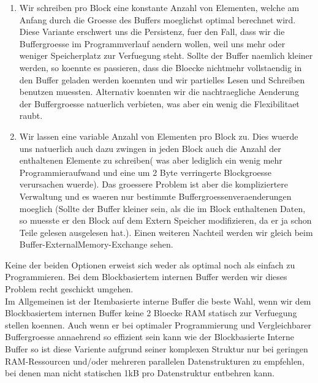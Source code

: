 \documentclass[10pt,a4paper]{article}
\begin{document}
\begin{enumerate}
\item Wir schreiben pro Block eine konstante Anzahl von Elementen, welche am Anfang durch die Groesse des Buffers moeglichst optimal berechnet wird. Diese Variante erschwert uns die Persistenz, fuer den Fall, dass wir die Buffergroesse im Programmverlauf aendern wollen, weil uns mehr oder weniger Speicherplatz zur Verfuegung steht. Sollte der Buffer naemlich kleiner  werden, so koennte es passieren, dass die Bloecke nichtmehr vollstaendig in den Buffer geladen werden koennten und wir partielles Lesen und Schreiben benutzen muessten. Alternativ koennten wir die nachtraegliche Aenderung der Buffergroesse natuerlich verbieten, was aber ein wenig die Flexibilitaet raubt.
\item Wir lassen eine variable Anzahl von Elementen pro Block zu. Dies wuerde uns natuerlich auch dazu zwingen in jeden Block auch die Anzahl der enthaltenen Elemente zu schreiben( was aber lediglich ein wenig mehr Programmieraufwand und eine um 2 Byte verringerte Blockgroesse verursachen wuerde). Das groessere Problem ist aber die kompliziertere Verwaltung und es waeren nur bestimmte Buffergroessenveraenderungen moeglich (Sollte der Buffer kleiner sein, als die im Block enthaltenen Daten, so muesste er den Block auf dem Extern Speicher modifizieren, da er ja schon Teile gelesen ausgelesen hat.). Einen weiteren Nachteil werden wir gleich beim Buffer-ExternalMemory-Exchange sehen.
\end{enumerate} 
Keine der beiden Optionen erweist sich weder als optimal noch als einfach zu Programmieren. Bei dem Blockbasiertem internen Buffer werden wir dieses Problem recht geschickt umgehen.\\
Im Allgemeinen ist der Itembasierte interne Buffer die beste Wahl, wenn wir dem Blockbasiertem internen Buffer keine 2 Bloecke RAM statisch zur Verfuegung stellen koennen. Auch wenn er bei optimaler Programmierung und Vergleichbarer Buffergroesse annaehrend so effizient sein kann wie der Blockbasierte Interne Buffer so ist diese Variente aufgrund seiner komplexen Struktur nur bei geringen RAM-Ressourcen und/oder mehreren parallelen Datenstrukturen zu empfehlen, bei denen man nicht statischen 1kB pro Datenstruktur entbehren kann. 
\end{document}
